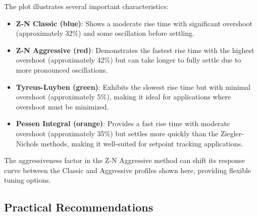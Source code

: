 \documentclass[a4paper,11pt]{article}
\begin{document}
The plot illustrates several important characteristics:

\begin{itemize}
    \item \textbf{Z-N Classic (blue)}: Shows a moderate rise time with significant overshoot (approximately 32\%) and some oscillation before settling.
    
    \item \textbf{Z-N Aggressive (red)}: Demonstrates the fastest rise time with the highest overshoot (approximately 42\%) but can take longer to fully settle due to more pronounced oscillations.
    
    \item \textbf{Tyreus-Luyben (green)}: Exhibits the slowest rise time but with minimal overshoot (approximately 5\%), making it ideal for applications where overshoot must be minimized.
    
    \item \textbf{Pessen Integral (orange)}: Provides a fast rise time with moderate overshoot (approximately 35\%) but settles more quickly than the Ziegler-Nichols methods, making it well-suited for setpoint tracking applications.
\end{itemize}

The aggressiveness factor in the Z-N Aggressive method can shift its response curve between the Classic and Aggressive profiles shown here, providing flexible tuning options.

\subsection{Practical Recommendations}
\end{document}
